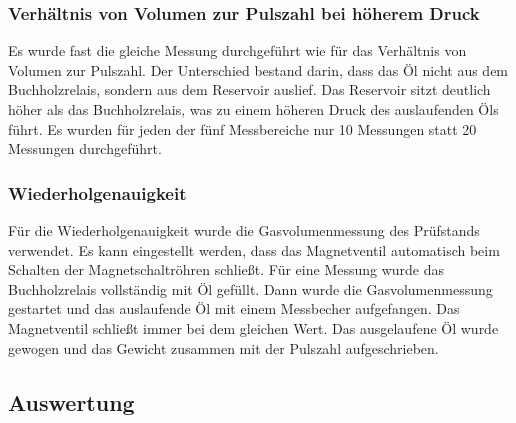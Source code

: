\subsubsection{Verhältnis von Volumen zur Pulszahl bei höherem Druck}
Es wurde fast die gleiche Messung durchgeführt wie für das Verhältnis von Volumen zur Pulszahl. Der Unterschied bestand darin, dass das Öl nicht aus dem Buchholzrelais, sondern aus dem Reservoir auslief. Das Reservoir sitzt deutlich höher als das Buchholzrelais, was zu einem höheren Druck des auslaufenden Öls führt. Es wurden für jeden der fünf Messbereiche nur 10 Messungen statt 20 Messungen durchgeführt.

\subsubsection{Wiederholgenauigkeit}
Für die Wiederholgenauigkeit wurde die Gasvolumenmessung des Prüfstands verwendet. Es kann eingestellt werden, dass das Magnetventil automatisch beim Schalten der Magnetschaltröhren schließt. Für eine Messung wurde das Buchholzrelais vollständig mit Öl gefüllt. Dann wurde die Gasvolumenmessung gestartet und das auslaufende Öl mit einem Messbecher aufgefangen. Das Magnetventil schließt immer bei dem gleichen Wert. Das ausgelaufene Öl wurde gewogen und das Gewicht zusammen mit der Pulszahl aufgeschrieben.
\newpage
\subsection{Auswertung}

